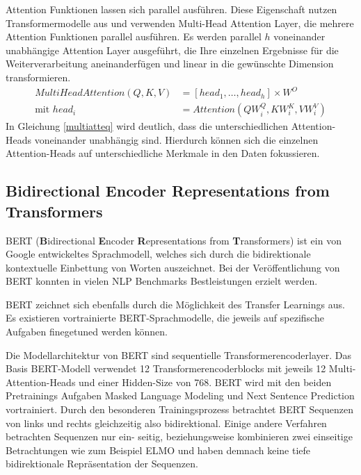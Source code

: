Attention Funktionen lassen sich parallel ausführen. Diese Eigenschaft nutzen Transformermodelle aus und verwenden Multi-Head Attention Layer, die mehrere Attention Funktionen parallel ausführen.
Es werden parallel $h$ voneinander unabhängige Attention Layer ausgeführt, die Ihre einzelnen Ergebnisse für die Weiterverarbeitung aneinanderfügen und linear in die gewünschte Dimension transformieren. 
\begin{equation}
    \label{multiatteq}
    \begin{split}
    MultiHeadAttention(Q,K,V) &= [head_1, \ldots, head_h] \times W^{O} \\
    \text{mit } head_i &= Attention(QW_i^Q,KW_i^K,VW_i^V)
    \end{split}
\end{equation}
In Gleichung \ref{multiatteq} wird deutlich, dass die unterschiedlichen Attention-Heads voneinander unabhängig sind. Hierdurch können sich die einzelnen Attention-Heads auf unterschiedliche Merkmale in den Daten fokussieren.



    


\subsection{\textbf{B}idirectional \textbf{E}ncoder \textbf{R}epresentations from \textbf{T}ransformers}
BERT (\textbf{B}idirectional \textbf{E}ncoder \textbf{R}epresentations from \textbf{T}ransformers) ist ein von Google \citep{DBLP:journals/corr/abs-1810-04805} entwickeltes Sprachmodell, welches sich durch die bidirektionale kontextuelle Einbettung von Worten auszeichnet.
Bei der Veröffentlichung von BERT konnten in vielen NLP Benchmarks Bestleistungen erzielt werden. 

BERT zeichnet sich ebenfalls durch die Möglichkeit des Transfer Learnings aus. Es existieren vortrainierte BERT-Sprachmodelle, die jeweils auf spezifische Aufgaben finegetuned werden können.

Die Modellarchitektur von BERT sind sequentielle Transformerencoderlayer. Das Basis BERT-Modell verwendet 12 Transformerencoderblocks mit jeweils 12 Multi-Attention-Heads und einer Hidden-Size von 768.
BERT wird mit den beiden Pretrainings Aufgaben Masked Language Modeling und Next Sentence Prediction vortrainiert. Durch den besonderen Trainingsprozess betrachtet BERT Sequenzen von links und rechts gleichzeitig also bidirektional. Einige andere Verfahren betrachten Sequenzen nur ein- seitig, beziehungsweise kombinieren zwei einseitige Betrachtungen wie zum Beispiel ELMO und haben demnach keine tiefe bidirektionale Repräsentation der Sequenzen.

